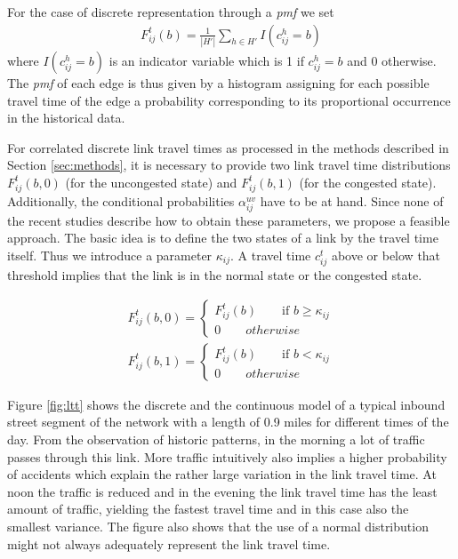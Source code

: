 For the case of discrete representation through a \textit{pmf} we set
\begin{gather}
F_{ij}^t(b) = \frac{1}{|H'|}\sum_{h\in H'} I(c_{ij}^h = b)
\end{gather}
where $I(c_{ij}^h = b)$ is an indicator variable which is 1 if $c_{ij}^h =
b$ and 0 otherwise. The \textit{pmf} of each edge is thus given by a histogram
assigning for each possible travel time of the edge a probability corresponding to its
proportional occurrence in the historical data. 

For correlated discrete link travel times as processed in the methods
described in Section \ref{sec:methods}, it is necessary to provide two link
travel time distributions $F_{ij}^t(b, 0)$ (for the uncongested state) and $F_{ij}^t(b, 1)$ (for the congested state).
Additionally, the conditional probabilities $\alpha^{uv}_{ij}$ have to be at
hand. Since none of the recent studies \cite{Waller02,Fan05}
describe how to obtain these parameters, we propose a feasible
approach. The basic idea is to define the two states of a link by the travel
time itself. Thus we introduce a parameter $\kappa_{ij}$. A travel time
$c_{ij}^t$ above or below that threshold implies that the link is in the normal
state or the congested state.

\begin{gather}
	F_{ij}^t(b, 0) = \begin{cases}F_{ij}^t(b) \qquad \text{if } b \geq
	\kappa_{ij}\\
	0 \qquad otherwise
	\end{cases} \\
	F_{ij}^t(b, 1) = \begin{cases}F_{ij}^t(b) \qquad \text{if } b < \kappa_{ij}\\
	0 \qquad otherwise
	\end{cases}
\end{gather}

Figure \ref{fig:ltt} shows the discrete and the continuous model of a typical
inbound street segment of the network with a length of 0.9 miles for different
times of the day. From the observation of historic patterns, in the morning a lot of traffic passes through this link. More
traffic intuitively also implies a higher probability of accidents which explain
the rather large variation in the link travel time. At noon the traffic is
reduced and in the evening the link travel time has the least amount of traffic,
yielding the fastest travel time and in this case also the smallest variance.
The figure also shows that the use of a normal distribution might not always
adequately represent the link travel time.


